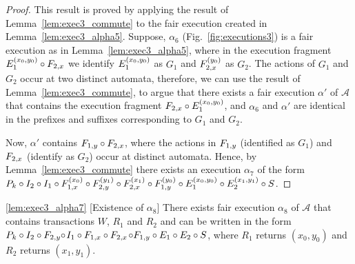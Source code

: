 \begin{proof}
\sloppy This result is proved by applying the result of Lemma~\ref{lem:exec3_commute}  to the fair execution created in Lemma~\ref{lem:exec3_alpha5}. 
Suppose,  $\alpha_6$ (Fig.~\ref{fig:executions3}) is a fair  execution as  in Lemma~\ref{lem:exec3_alpha5}, 
where in  the   execution fragment 
$\fragt{E_1}{\alpha_6}{x_0, y_0}\circ\fragt{F_{2,x}}{\alpha_6}{}$  we identify 
 $\fragt{E_1}{\alpha_6}{x_0, y_0}$  as $G_1$ and 
$\fragt{F_{2,x}}{\alpha_6}{y_0}$  as $G_2$. The actions of $G_1$ and $G_2$ occur at two distinct automata, therefore,  we  can use the result of Lemma~\ref{lem:exec3_commute}, to argue that there exists a fair execution $\alpha'$ of $\mathcal{A}$  that  contains the  execution fragment 
$\fragt{F_{2,x}}{\alpha_7}{}  \circ\fragt{E_1}{\alpha_7}{x_0, y_0}$, and $\alpha_6$ and $\alpha'$ are identical in the prefixes and suffixes corresponding to $G_1$ and $G_2$.

 Now,  $\alpha'$ contains  $\fragt{F_{1,y}}{\alpha''}{} \circ \fragt{F_{2,x}}{\alpha'}{}$, where  
  the actions in  $\fragt{F_{1,y}}{\alpha''}{}$ (identified as $G_1$) and $\fragt{F_{2,x}}{\alpha''}{}$ (identify as $G_2$)  occur  at distinct automata. Hence, by  Lemma~\ref{lem:exec3_commute} there exists  an execution $\alpha_7$ of the form
$\finiteprefixA{k-1}{k}  \circ \fragt{I_2}{\alpha_7}{}  \circ \fragt{I_1}{\alpha_7}{} \circ \fragt{F_{1,x}}{\alpha_7}{x_0} 
\circ \fragt{F_{2,y}}{\alpha_7}{y_1}\circ \fragt{F_{2,x}}{\alpha_7}{x_1} 
 \circ \fragt{F_{1,y}}{\alpha_7}{y_0} \circ\fragt{E_1}{\alpha_7}{x_0, y_0}\circ
 \fragt{E_2}{\alpha_7}{x_1, y_1}\circ \fragt{S}{\alpha_7}{}$.
%
\end{proof}


\begin{lemma*}  \ref{lem:exec3_alpha7} [Existence of $\alpha_8$] 
\sloppy There exists  fair execution $\alpha_8$  of $\mathcal{A}$ that contains transactions $W$, $R_1$ and $R_2$
and   can be written in the form 
$\finiteprefixA{k-1}{k}  \circ  \fragt{I_2}{\alpha_8}{} \circ \fragn{F_{2,y}}{\alpha_8}{y_1} \circ 
$$\fragt{I_1}{\alpha_8}{} \circ \fragn{F_{1,x}}{\alpha_8}{x_0} 
\circ  \fragn{F_{2,x}}{\alpha_8}{x_1} 
$$ \circ \fragn{F_{1,y}}{\alpha_8}{y_0} \circ \fragn{E_1}{\alpha_8}{x_0, y_0}
\circ \fragn{E_2}{\alpha_8}{x_1, y_1}\circ \fragt{S}{\alpha_8}{}$, where $R_1$ returns $(x_0, y_0)$ and $R_2$ returns $(x_1, y_1)$.
\end{lemma*}

